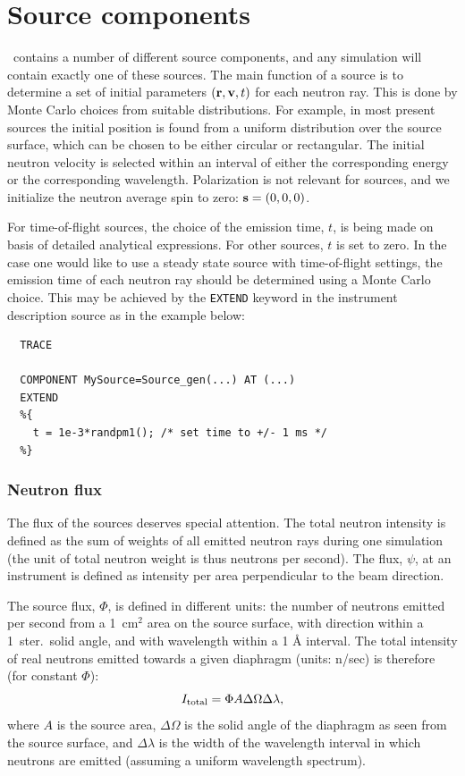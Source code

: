 
\chapter{Source components}
\label{c:source}

\MCS\ contains a number of different source components,
and any simulation will contain exactly one of these sources.
The main function of a source is to determine a set of initial
parameters $({\bf r}, {\bf v}, t)$
for each neutron ray. This is done by Monte Carlo choices from
suitable distributions. For example, in most present sources
the initial position is
found from a uniform distribution over the source surface,
which can be chosen to be either circular or rectangular.
The initial neutron velocity is selected within an interval
of either the corresponding energy or the corresponding wavelength.
Polarization is not relevant for sources,
and we initialize the neutron average spin to zero: ${\bf s}=(0,0,0)$.

For time-of-flight sources, the choice of the emission time, $t$,
is being made on basis of detailed analytical expressions.
For other sources, $t$ is set to zero.
In the case one would like to use a steady state source
with time-of-flight settings,
the emission time of each neutron ray should be determined using
a Monte Carlo choice. This may be achieved by
the \verb+EXTEND+ keyword in the instrument description source
as in the example below:

\begin{verbatim}
  TRACE

  COMPONENT MySource=Source_gen(...) AT (...)
  EXTEND
  %{
    t = 1e-3*randpm1(); /* set time to +/- 1 ms */
  %}
\end{verbatim}

\subsection{Neutron flux}
\label{s:neutron-flux}
The flux of the sources deserves special attention. The total neutron
intensity is defined as the sum of weights of all emitted neutron rays
during one simulation
(the unit of total neutron weight is thus neutrons per second).
The flux, $\psi$, at an instrument is defined as intensity per area perpendicular
to the beam direction.

The source flux, $\Phi$, is defined in different units:
the number of neutrons emitted per second from a
1~cm$^2$ area on the source surface,
with direction within a 1~ster.\ solid angle,
and with wavelength within a 1 {\AA} interval.
The total intensity of real neutrons emitted towards a given diaphragm
(units: n/sec) is therefore (for constant $\Phi$):
\begin{equation}
I_{\rm total} = \Phi A \Delta\Omega \Delta\lambda ,
\end{equation}
where $A$ is the source area, $\Delta\Omega$ is the solid angle of the
diaphragm as seen from the source surface, and $\Delta\lambda$ is the
width of the wavelength interval in which neutrons are emitted (assuming
a uniform wavelength spectrum).

